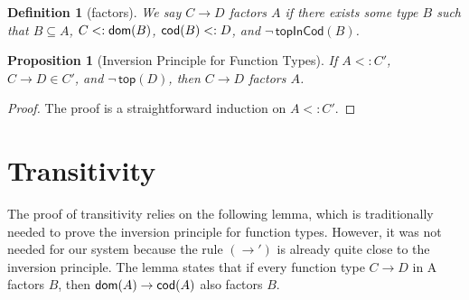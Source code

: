 \documentclass{article}
\newtheorem{proposition}[theorem]{Proposition}
\newtheorem{definition}[theorem]{Definition}
\begin{document}
\begin{definition}[factors]
  We say $C \to D$ \emph{factors} $A$
  if there exists some type $B$ such that
  $B \subseteq A$, $C <: \mathsf{dom}(B)$, $\mathsf{cod}(B) <: D$, and
  $\neg\,\mathsf{topInCod}(B)$.
\end{definition}

\begin{proposition}[Inversion Principle for Function Types]
  \label{prop:⊑-fun-inv}
  If $A <: C'$, $C \to D \in C'$, and $\neg\,\mathsf{top}(D)$, then
  $C \to D$ factors $A$.
\end{proposition}
\begin{proof}
  The proof is a straightforward induction on $A <: C'$.
\end{proof}

\section{Transitivity}
\label{sec:trans}

The proof of transitivity relies on the following lemma, which is
traditionally needed to prove the inversion principle for function
types. However, it was not needed for our system because the rule
$(\to')$ is already quite close to the inversion principle.
The lemma states that if every function type $C \to D$ in A
factors $B$, then $\mathsf{dom}(A) \to \mathsf{cod}(A)$ also factors $B$.
\end{document}
